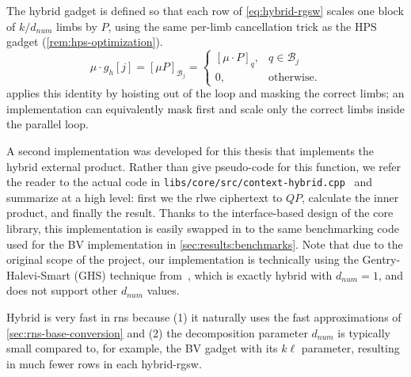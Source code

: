 \begin{remark}
    The hybrid gadget is defined so that each row of \eqref{eq:hybrid-rgsw} scales one block of $k/d_{num}$ limbs by $P$, using the same per-limb cancellation trick as the HPS gadget (\autoref{rem:hps-optimization}). %
    \begin{equation*}
        \mu\cdot g_h[j] = [\mu P]_{\mathcal{B}_j} = \begin{cases}
            [\mu\cdot P]_{q}, & q \in \mathcal{B}_j \\
            0, & \text{otherwise.}
        \end{cases}
    \end{equation*}
     applies this identity by hoisting  out of the loop and masking the correct limbs; an implementation can equivalently mask first and scale only the correct limbs inside the parallel loop.
\end{remark}



% 

A second implementation was developed for this thesis that implements the hybrid external product. Rather than give pseudo-code for this function, we refer the reader to the actual code in \texttt{libs/core/src/context-hybrid.cpp}~\cite{gitrepo} and summarize at a high level: first we  the \gls{rlwe} ciphertext to $QP$, calculate the inner product, and finally  the result. Thanks to the interface-based design of the core library, this implementation is easily swapped in to the same benchmarking code used for the BV implementation in \cref{sec:results:benchmarks}. Note that due to the original scope of the project, our implementation is technically using the {Gentry-Halevi-Smart (GHS)} technique from~\cite{cryptoeprint:2012/099}, which is exactly hybrid with $d_{num} = 1$, and does not support other $d_{num}$ values.

\newpage
Hybrid is very fast in \gls{rns} because (1) it naturally uses the fast approximations of \cref{sec:rns-base-conversion} and (2) the decomposition parameter $d_{num}$ is typically small compared to, for example, the BV gadget with its $k\ell$ parameter, resulting in much fewer rows in each hybrid-\gls{rgsw}.

